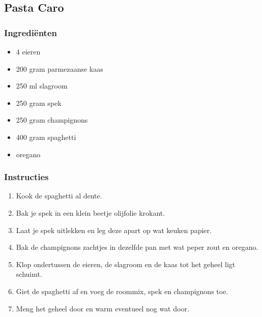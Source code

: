 \subsection{Pasta Caro}
\subsubsection*{Ingrediënten}
\begin{multicols}{2}
    \begin{itemize}
        \item 4 eieren
        \item 200 gram parmezaanse kaas
        \item 250 ml slagroom
        \item 250 gram spek
        \item 250 gram champignons
        \item 400 gram spaghetti
        \item oregano
    \end{itemize}
\end{multicols}

\subsubsection*{Instructies}
\begin{multicols}{2}
    \begin{enumerate}
        \item Kook de spaghetti al dente.
        \item Bak je spek in een klein beetje olijfolie krokant.
        \item Laat je spek uitlekken en leg deze apart op wat keuken papier.
        \item Bak de champignons zachtjes in dezelfde pan met wat peper zout en oregano.
        \item Klop ondertussen de eieren, de slagroom en de kaas tot het geheel ligt schuimt.
        \item Giet de spaghetti af en voeg de roommix, spek en champignons toe.
        \item Meng het geheel door en warm eventueel nog wat door.
    \end{enumerate}
\end{multicols}